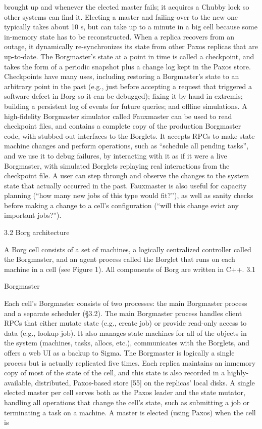 brought up and whenever the elected master fails; it acquires
a Chubby lock so other systems can find it. Electing a master
and failing-over to the new one typically takes about 10 s, but
can take up to a minute in a big cell because some in-memory
state has to be reconstructed. When a replica recovers from
an outage, it dynamically re-synchronizes its state from other
Paxos replicas that are up-to-date.
The Borgmaster’s state at a point in time is called a
checkpoint, and takes the form of a periodic snapshot plus a
change log kept in the Paxos store. Checkpoints have many
uses, including restoring a Borgmaster’s state to an arbitrary
point in the past (e.g., just before accepting a request that
triggered a software defect in Borg so it can be debugged);
fixing it by hand in extremis; building a persistent log of
events for future queries; and offline simulations.
A high-fidelity Borgmaster simulator called Fauxmaster
can be used to read checkpoint files, and contains a complete
copy of the production Borgmaster code, with stubbed-out
interfaces to the Borglets. It accepts RPCs to make state machine changes and perform operations, such as “schedule all
pending tasks”, and we use it to debug failures, by interacting with it as if it were a live Borgmaster, with simulated
Borglets replaying real interactions from the checkpoint file.
A user can step through and observe the changes to the system state that actually occurred in the past. Fauxmaster is
also useful for capacity planning (“how many new jobs of
this type would fit?”), as well as sanity checks before making a change to a cell’s configuration (“will this change evict
any important jobs?”).


3.2 Borg architecture

A Borg cell consists of a set of machines, a logically centralized controller called the Borgmaster, and an agent process
called the Borglet that runs on each machine in a cell (see
Figure 1). All components of Borg are written in C++.
3.1

Borgmaster

Each cell’s Borgmaster consists of two processes: the main
Borgmaster process and a separate scheduler (§3.2). The
main Borgmaster process handles client RPCs that either
mutate state (e.g., create job) or provide read-only access
to data (e.g., lookup job). It also manages state machines
for all of the objects in the system (machines, tasks, allocs,
etc.), communicates with the Borglets, and offers a web UI
as a backup to Sigma.
The Borgmaster is logically a single process but is actually replicated five times. Each replica maintains an inmemory copy of most of the state of the cell, and this state is
also recorded in a highly-available, distributed, Paxos-based
store [55] on the replicas’ local disks. A single elected master per cell serves both as the Paxos leader and the state
mutator, handling all operations that change the cell’s state,
such as submitting a job or terminating a task on a machine. A master is elected (using Paxos) when the cell is

